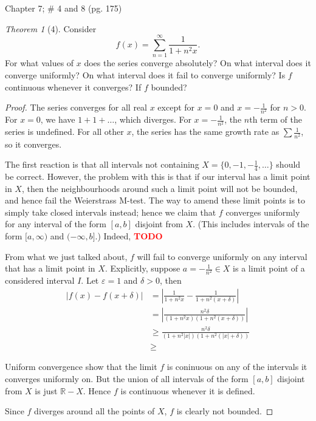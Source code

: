 \documentclass[12pt]{article}
\newcommand{\todo}{\textcolor{red}{\textbf{TODO }}}
\theoremstyle{remark}
\theoremstyle{named}
\newtheorem*{theorem}{Theorem}
\renewcommand{\d}{\delta}
\newcommand{\e}{\varepsilon}
\newcommand{\R}{\mathbb R}
\newcommand{\abs}[1]{|#1|}
\newcommand{\bigabs}[1]{\left|#1\right|}
\begin{document}
Chapter 7; \# 4 and 8 (pg. 175)

\begin{theorem}[4]
    Consider \[f(x) = \sum_{n = 1}^\infty \frac{1}{1 + n^2x}.\]
    For what values of \(x\) does the series converge absolutely? On what interval does it converge uniformly? On what interval does it fail to converge uniformly? Is \(f\) continuous whenever it converges? If \(f\) bounded?
\end{theorem}

\begin{proof}
    The series converges for all real \(x\) except for \(x = 0\) and \(x = -\frac{1}{n^2}\) for \(n > 0\). For \(x = 0\), we have \(1 + 1 + \dots\), which diverges. For \(x = -\frac{1}{n^2}\), the \(n\)th term of the series is undefined. For all other \(x\), the series has the same growth rate as \(\sum \frac{1}{n^2}\), so it converges. 

    The first reaction is that all intervals not containing \(X = \{0, -1, -\frac{1}{4}, \dots\}\) should be correct. However, the problem with this is that if our interval has a limit point in \(X\), then the neighbourhoods around such a limit point will not be bounded, and hence fail the Weierstrass M-test. 
    The way to amend these limit points is to simply take closed intervals instead; hence we claim that \(f\) converges uniformly for any interval of the form \([a, b]\) disjoint from \(X\). (This includes intervals of the form \([a, \infty)\) and \((-\infty, b]\).) 
    Indeed, \todo

    From what we just talked about, \(f\) will fail to converge uniformly on any interval that has a limit point in \(X\). Explicitly, suppose \(a = -\frac{1}{n^2} \in X\) is a limit point of a considered interval \(I\). Let \(\e = 1\) and \(\d > 0\), then 
    \begin{align*}
        \bigabs{f(x) - f(x + \d)} &= \bigabs{\frac{1}{1 + n^2x} - \frac{1}{1 + n^2(x + \d)}} \\
        &= \bigabs{\frac{n^2\d}{(1+n^2 x) (1 + n^2 (x + \d))}} \\
        &\ge \frac{n^2 \d}{(1+n^2 \abs{x}) (1 + n^2 (\abs{x} + \d))} \\
        &\ge 
    \end{align*}

    Uniform convergence show that the limit \(f\) is coninuous on any of the intervals it converges uniformly on. But the union of all intervals of the form \([a, b]\) disjoint from \(X\) is just \(\R - X\). Hence \(f\) is continuous whenever it is defined. 

    Since \(f\) diverges around all the points of \(X\), \(f\) is clearly not bounded. 
\end{proof}
\end{document}
